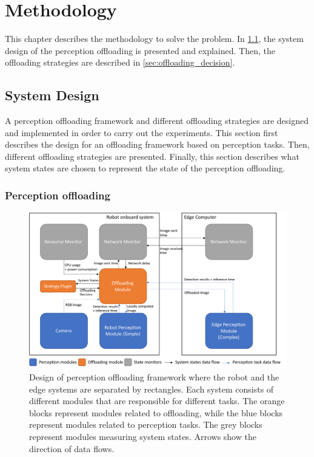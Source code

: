 \chapter{Methodology}\label{ch:methodology}

This chapter describes the methodology to solve the problem. In \cref{sec:system_design}, the system design of the perception offloading is presented and explained. Then, the offloading strategies are described in \cref{sec:offloading_decision}. 

\section{System Design}\label{sec:system_design}

A perception offloading framework and different offloading strategies are designed and implemented in order to carry out the experiments. This section first describes the design for an offloading framework based on perception tasks. Then, different offloading strategies are presented. Finally, this section describes what system states are chosen to represent the state of the perception offloading.

\subsection{Perception offloading}

\begin{figure}[htp]
    \centering
    \includegraphics[width=\linewidth]{figures/setup/system_design.pdf}
    \caption[Design of perception offloading framework]{Design of perception offloading framework where the robot and the edge systems are separated by rectangles. Each system consists of different modules that are responsible for different tasks. The orange blocks represent modules related to offloading, while the blue blocks represent modules related to perception tasks. The grey blocks represent modules measuring system states. Arrows show the direction of data flows.}
    \label{fig:perception_offloading_framework}
\end{figure}

